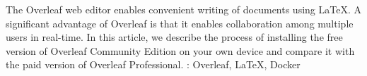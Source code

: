 \documentclass{csbulletin}
\begin{document}
\printbibliography  

\begin{summary}
The Overleaf web editor enables convenient writing of documents using \LaTeX. A significant advantage of Overleaf is that it enables collaboration among multiple users in real-time. In this article, we describe the process of installing the free version of Overleaf Community Edition on your own device and compare it with the paid version of Overleaf Professional.
\keywords: Overleaf, \LaTeX, Docker
\end{summary}
\end{document}
